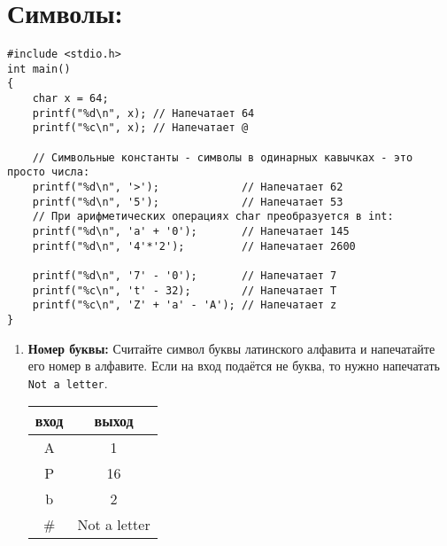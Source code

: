 \documentclass{article}
\begin{document}
\section*{Символы:}
\begin{lstlisting}
#include <stdio.h>
int main() 
{
	char x = 64; 
	printf("%d\n", x); // Напечатает 64
	printf("%c\n", x); // Напечатает @
	
	// Символьные константы - символы в одинарных кавычках - это просто числа:
	printf("%d\n", '>');             // Напечатает 62
	printf("%d\n", '5');             // Напечатает 53
	// При арифметических операциях char преобразуется в int:
	printf("%d\n", 'a' + '0');       // Напечатает 145
	printf("%d\n", '4'*'2');         // Напечатает 2600
	
	printf("%d\n", '7' - '0');       // Напечатает 7
	printf("%c\n", 't' - 32);        // Напечатает T
	printf("%c\n", 'Z' + 'a' - 'A'); // Напечатает z
}
\end{lstlisting}

\begin{enumerate}
\item \textbf{Номер буквы:} Считайте символ буквы латинского алфавита и напечатайте его номер в алфавите. Если на вход подаётся не буква, то нужно напечатать \texttt{Not a letter}.
\begin{center}
\begin{tabular}{ c | c }
 вход & выход \\ \hline
 A & 1  \\ 
 P & 16 \\
 b & 2 \\
 \# & Not a letter\\ 
\end{tabular}
\end{center}
\end{enumerate}
\newpage
\end{document}
